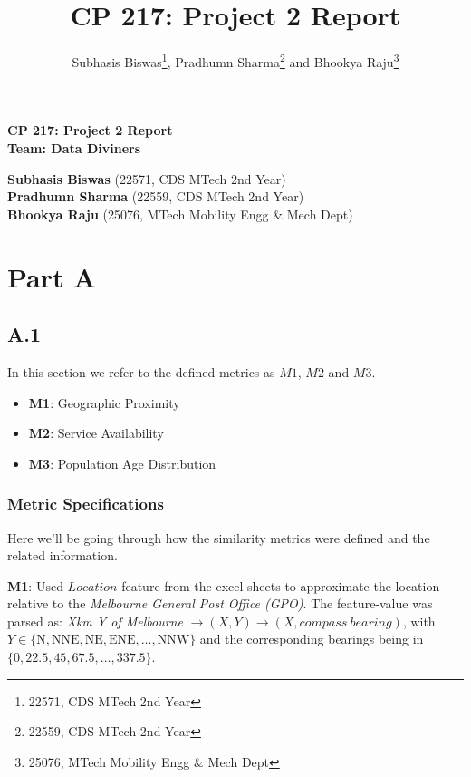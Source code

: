 \documentclass[
	a4paper, %
	10pt, %
	unnumberedsections, %
	twoside, %
]{LTJournalArticle}
\title{CP 217: Project 2 Report} %
\author{%
	Subhasis Biswas\thanks{22571, CDS MTech 2nd Year},  Pradhumn Sharma\thanks{22559, CDS MTech 2nd Year} and Bhookya Raju\thanks{25076, MTech Mobility Engg \& Mech Dept}
}
\begin{document}

\begin{center}
  \textbf{\Large CP 217: Project 2 Report} \\[1em]
  \textbf{Team: Data Diviners} \\[2em]
\end{center}
\vspace{-8pt}
\textbf{Subhasis Biswas} \> (22571, CDS MTech 2nd Year) \\
\textbf{Pradhumn Sharma} \> (22559, CDS MTech 2nd Year) \\
\textbf{Bhookya Raju} \> (25076, MTech Mobility Engg \& Mech Dept) \\



\vspace{-8pt}

\section{Part A}



\subsection{A.1}

In this section we refer to the defined metrics as $M1$, $M2$ and $M3$.
\begin{itemize}
    \item \textbf{M1}: Geographic Proximity
    \item \textbf{M2}: Service Availability
    \item \textbf{M3}: Population Age Distribution
\end{itemize}

\subsubsection{Metric Specifications}\leavevmode


Here we'll be going through how the similarity metrics were defined and the related information.

\textbf{M1}: Used $Location$ feature from the excel sheets to approximate the location relative to the \textit{Melbourne General Post Office (GPO)}. The feature-value was parsed as: \newline
\textit{Xkm Y of Melbourne} $\rightarrow (X, Y) \rightarrow (X, compass\ bearing)$, with $Y \in \{\text{N}, \text{NNE}, \text{NE}, \text{ENE}, \dots,\text{NNW}\}$ and the corresponding bearings being in $\{0, 22.5, 45, 67.5,\dots, 337.5\}$.
\end{document}
